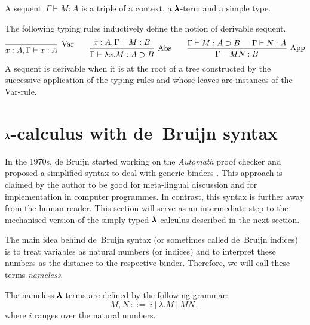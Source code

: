 \begin{definition}[Sequent]
  A sequent~$\Gamma \vdash M:A$ is a triple of a context, a $\pmb{\lambda}$-term and a simple type.
\end{definition}

\begin{definition}
  \label{typing_rules}
  The following typing rules inductively define the notion of derivable sequent.
  \[
    \begin{prooftree}
      \infer0[Var]{ x:A, \Gamma \vdash x:A } 
    \end{prooftree}
    \qquad
    \begin{prooftree}
      \hypo{ x:A, \Gamma \vdash M:B }
      \infer1[Abs]{ \Gamma \vdash \lambda x . M : A \supset B  } 
    \end{prooftree}
    \qquad
    \begin{prooftree}
      \hypo{ \Gamma \vdash M : A \supset B }
      \hypo{ \Gamma \vdash N : A }	
      \infer2[App]{ \Gamma \vdash M N : B } 
    \end{prooftree}
  \]
  A sequent is derivable when it is at the root of a tree constructed by the successive application of the typing rules and whose leaves are instances of the Var-rule.  
\end{definition}


\section{$\pmb{\lambda}$-calculus with de~Bruijn syntax}

In the 1970s, de Bruijn started working on the \textit{Automath} proof checker and proposed a simplified syntax to deal with generic binders \cite{deBruijn}.
This approach is claimed by the author to be good for meta-lingual discussion and for implementation in computer programmes.
In contrast, this syntax is further away from the human reader.
This section will serve as an intermediate step to the mechanised version of the simply typed $\pmb{\lambda}$-calculus described in the next section.

The main idea behind de~Bruijn syntax (or sometimes called de~Bruijn indices) is to treat variables as natural numbers (or indices) and to interpret these numbers as the distance to the respective binder.
Therefore, we will call these terms \textit{nameless}. 

\begin{definition}
  The nameless $\pmb{\lambda}$-terms are defined by the following grammar:
  \[ M, N \ ::= \ i \ | \ \lambda . M \ | \ M N \ , \]  
  where $i$ ranges over the natural numbers.
\end{definition}

